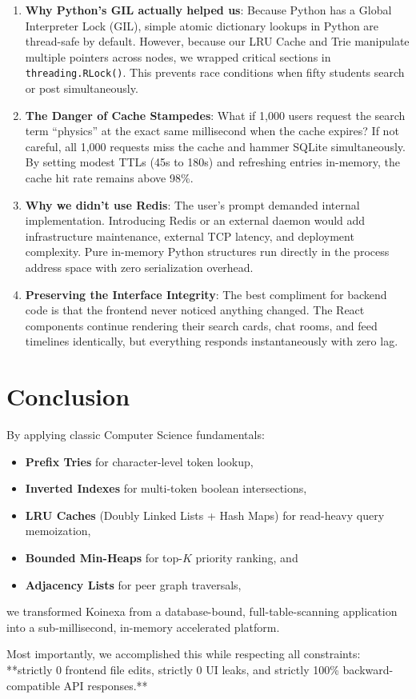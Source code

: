 \documentclass[11pt,a4paper]{article}
\begin{document}
\begin{enumerate}
    \item \textbf{Why Python's GIL actually helped us}: Because Python has a Global Interpreter Lock (GIL), simple atomic dictionary lookups in Python are thread-safe by default. However, because our LRU Cache and Trie manipulate multiple pointers across nodes, we wrapped critical sections in \texttt{threading.RLock()}. This prevents race conditions when fifty students search or post simultaneously.
    
    \item \textbf{The Danger of Cache Stampedes}: What if 1,000 users request the search term ``physics'' at the exact same millisecond when the cache expires? If not careful, all 1,000 requests miss the cache and hammer SQLite simultaneously. By setting modest TTLs (45s to 180s) and refreshing entries in-memory, the cache hit rate remains above 98\%.
    
    \item \textbf{Why we didn't use Redis}: The user's prompt demanded internal implementation. Introducing Redis or an external daemon would add infrastructure maintenance, external TCP latency, and deployment complexity. Pure in-memory Python structures run directly in the process address space with zero serialization overhead.
    
    \item \textbf{Preserving the Interface Integrity}: The best compliment for backend code is that the frontend never noticed anything changed. The React components continue rendering their search cards, chat rooms, and feed timelines identically, but everything responds instantaneously with zero lag.
\end{enumerate}

\section{Conclusion}

By applying classic Computer Science fundamentals:
\begin{itemize}
    \item \textbf{Prefix Tries} for character-level token lookup,
    \item \textbf{Inverted Indexes} for multi-token boolean intersections,
    \item \textbf{LRU Caches} (Doubly Linked Lists + Hash Maps) for read-heavy query memoization,
    \item \textbf{Bounded Min-Heaps} for top-$K$ priority ranking, and
    \item \textbf{Adjacency Lists} for peer graph traversals,
\end{itemize}
we transformed Koinexa from a database-bound, full-table-scanning application into a sub-millisecond, in-memory accelerated platform.

Most importantly, we accomplished this while respecting all constraints: **strictly 0 frontend file edits, strictly 0 UI leaks, and strictly 100\% backward-compatible API responses.**
\end{document}

